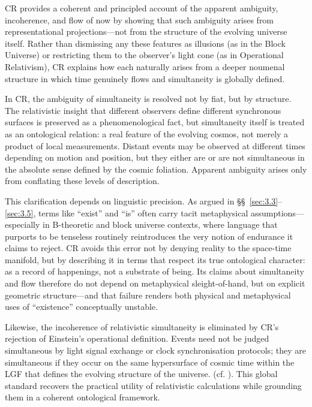 \documentclass[12pt]{book}
\begin{document}
CR provides a coherent and principled account of the apparent ambiguity, incoherence, and flow of now by showing that such ambiguity arises from representational projections---not from the structure of the evolving universe itself. Rather than dismissing any these features as illusions (as in the Block Universe) or restricting them to the observer's light cone (as in Operational Relativism), CR explains how each naturally arises from a deeper noumenal structure in which time genuinely flows and simultaneity is globally defined.

In CR, the ambiguity of simultaneity is resolved not by fiat, but by structure. The relativistic insight that different observers define different synchronous surfaces is preserved as a phenomenological fact, but simultaneity itself is treated as an ontological relation: a real feature of the evolving cosmos, not merely a product of local measurements. Distant events may be observed at different times depending on motion and position, but they either are or are not simultaneous in the absolute sense defined by the cosmic foliation. Apparent ambiguity arises only from conflating these levels of description.

This clarification depends on linguistic precision. As argued in \S\S~\ref{sec:3.3}--\ref{sec:3.5}, terms like ``exist'' and ``is'' often carry tacit metaphysical assumptions---especially in B-theoretic and block universe contexts, where language that purports to be tenseless routinely reintroduces the very notion of endurance it claims to reject. CR avoids this error not by denying reality to the space-time manifold, but by describing it in terms that respect its true ontological character: as a record of happenings, not a substrate of being. Its claims about simultaneity and flow therefore do not depend on metaphysical sleight-of-hand, but on explicit geometric structure---and that failure renders both physical and metaphysical uses of ``existence'' conceptually unstable.

Likewise, the incoherence of relativistic simultaneity is eliminated by CR's rejection of Einstein's operational definition. 
Events need not be judged simultaneous by light signal exchange or clock synchronisation protocols; they are simultaneous if they occur on the same hypersurface of cosmic time within the LGF that defines the evolving structure of the universe. (cf. \citealp{reichenbach1958,Sklar1974,Brown2005}). This global standard recovers the practical utility of relativistic calculations while grounding them in a coherent ontological framework.
\end{document}
